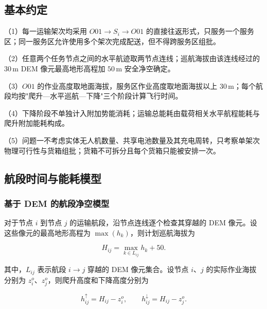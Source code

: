 \documentclass[bwprint,fontset=fandol]{gmcmthesis}
\begin{document}
\subsection{基本约定}
（1）每一运输架次均采用 $O01 \to S_i \to O01$ 的直接往返形式，只服务一个服务区；同一服务区允许使用多个架次完成配送，但不得跨服务区组批。

（2）任意两个任务节点之间的水平航迹取两节点连线；巡航海拔由该连线经过的 $30\,\mathrm{m}$ DEM 像元最高地形高程加 $50\,\mathrm{m}$ 安全净空确定。

（3）$O01$ 的作业高度取地面海拔，服务区作业高度取地面海拔以上 $30\,\mathrm{m}$；每个航段均按"爬升—水平巡航—下降"三个阶段计算飞行时间。

（4）下降阶段不单独计入附加势能消耗；运输总能耗由载荷相关水平航程能耗与爬升附加能耗构成。

（5）问题一不考虑实体无人机数量、共享电池数量及其充电周转，只考察单架次物理可行性与货箱组批；货箱不可拆分且每个货箱只能被安排一次。
\FloatBarrier

\subsection{航段时间与能耗模型}

\subsubsection{基于 DEM 的航段净空模型}

对于节点 $i$ 到节点 $j$ 的运输航段，沿节点连线逐个检查其穿越的 DEM 像元。设这些像元的最高地形高程为 $\max(h_k)$，则计划巡航海拔为

\begin{equation}
H_{ij} = \max_{k\in L_{ij}} h_k + 50.
\label{eq:q1-clearance}
\end{equation}

其中，$L_{ij}$ 表示航段 $i\to j$ 穿越的 DEM 像元集合。设节点 $i$、$j$ 的实际作业海拔分别为 $z_i^o$、$z_j^o$，则爬升高度和下降高度分别为

\begin{equation}
h_{ij}^{\uparrow} = H_{ij}-z_i^{o},\qquad
h_{ij}^{\downarrow} = H_{ij}-z_j^{o}.
\label{eq:q1-vertical-height}
\end{equation}
\end{document}
